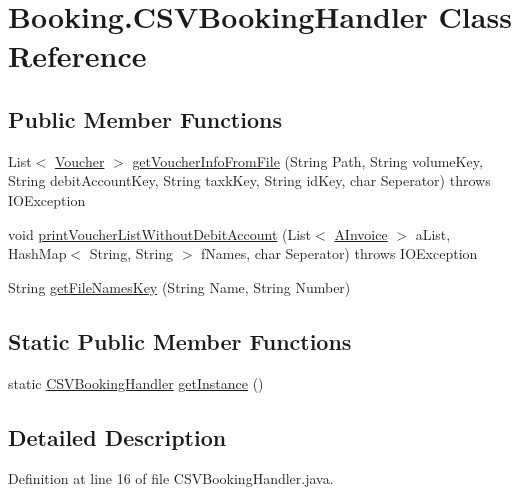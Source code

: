 \hypertarget{class_booking_1_1_c_s_v_booking_handler}{}\section{Booking.\+C\+S\+V\+Booking\+Handler Class Reference}
\label{class_booking_1_1_c_s_v_booking_handler}
\subsection*{Public Member Functions}
\begin{DoxyCompactItemize}
\item 
List$<$ \hyperlink{class_booking_1_1_voucher}{Voucher} $>$ \hyperlink{class_booking_1_1_c_s_v_booking_handler_ad9ffa72c3554080d3b2383805116ca29}{get\+Voucher\+Info\+From\+File} (String Path, String volume\+Key, String debit\+Account\+Key, String taxk\+Key, String id\+Key, char Seperator)  throws I\+O\+Exception
\item 
void \hyperlink{class_booking_1_1_c_s_v_booking_handler_a6e4ea9a0c47bb915dc9c33f82ba34b16}{print\+Voucher\+List\+Without\+Debit\+Account} (List$<$ \hyperlink{class_reduced_invoice_1_1_a_invoice}{A\+Invoice} $>$ a\+List, Hash\+Map$<$ String, String $>$ f\+Names, char Seperator)  throws I\+O\+Exception
\item 
String \hyperlink{class_booking_1_1_c_s_v_booking_handler_a079ed3880466f90e57969cd85157dfe2}{get\+File\+Names\+Key} (String Name, String Number)
\end{DoxyCompactItemize}
\subsection*{Static Public Member Functions}
\begin{DoxyCompactItemize}
\item 
static \hyperlink{class_booking_1_1_c_s_v_booking_handler}{C\+S\+V\+Booking\+Handler} \hyperlink{class_booking_1_1_c_s_v_booking_handler_a7b9f19a1917141d43d2eadf01f4c51e8}{get\+Instance} ()
\end{DoxyCompactItemize}


\subsection{Detailed Description}


Definition at line 16 of file C\+S\+V\+Booking\+Handler.\+java.



